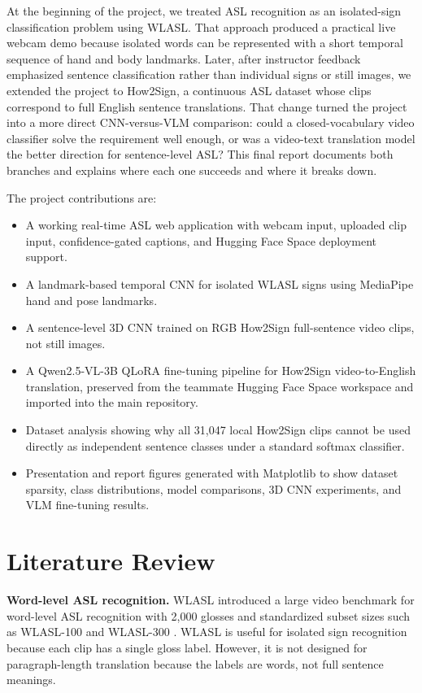 \documentclass[10pt,twocolumn,letterpaper]{article}
\begin{document}
At the beginning of the project, we treated ASL recognition as an isolated-sign classification problem using WLASL. That approach produced a practical live webcam demo because isolated words can be represented with a short temporal sequence of hand and body landmarks. Later, after instructor feedback emphasized sentence classification rather than individual signs or still images, we extended the project to How2Sign, a continuous ASL dataset whose clips correspond to full English sentence translations. That change turned the project into a more direct CNN-versus-VLM comparison: could a closed-vocabulary video classifier solve the requirement well enough, or was a video-text translation model the better direction for sentence-level ASL? This final report documents both branches and explains where each one succeeds and where it breaks down.

The project contributions are:
\begin{itemize}
    \item A working real-time ASL web application with webcam input, uploaded clip input, confidence-gated captions, and Hugging Face Space deployment support.
    \item A landmark-based temporal CNN for isolated WLASL signs using MediaPipe hand and pose landmarks.
    \item A sentence-level 3D CNN trained on RGB How2Sign full-sentence video clips, not still images.
    \item A Qwen2.5-VL-3B QLoRA fine-tuning pipeline for How2Sign video-to-English translation, preserved from the teammate Hugging Face Space workspace and imported into the main repository.
    \item Dataset analysis showing why all 31,047 local How2Sign clips cannot be used directly as independent sentence classes under a standard softmax classifier.
    \item Presentation and report figures generated with Matplotlib to show dataset sparsity, class distributions, model comparisons, 3D CNN experiments, and VLM fine-tuning results.
\end{itemize}

\section{Literature Review}

\textbf{Word-level ASL recognition.} WLASL introduced a large video benchmark for word-level ASL recognition with 2,000 glosses and standardized subset sizes such as WLASL-100 and WLASL-300 \cite{li2020wlasl}. WLASL is useful for isolated sign recognition because each clip has a single gloss label. However, it is not designed for paragraph-length translation because the labels are words, not full sentence meanings.
\end{document}
